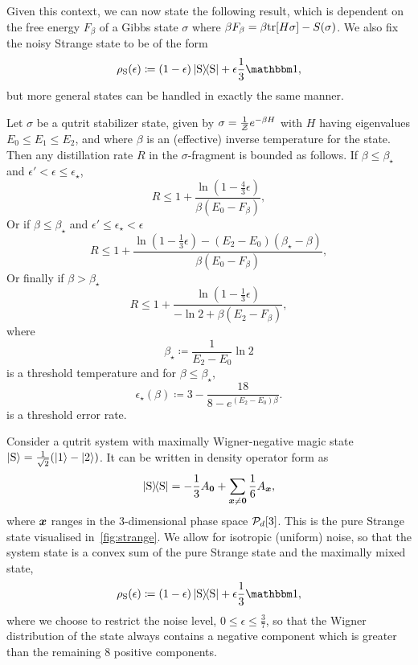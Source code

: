 \documentclass[pra,
aps,
twocolumn,
superscriptaddress,
groupedaddress,
nofootinbib,
reprint
]{revtex4-1}
\begin{document}
Given this context, we can now state the following result, which is dependent on the free energy $F_\beta$ of a Gibbs state $\sigma$ where $ \beta F_\beta =  \beta\tr[H \sigma] - S(\sigma)$. We also fix the noisy Strange state to be of the form 
\begin{equation}
	\rho_{\rm{S}}(\epsilon) \coloneqq (1-\epsilon)\ketbra{\rm{S}} + \epsilon \frac{1}{3}\id,
\end{equation}
but more general states can be handled in exactly the same manner.
\begin{theorem}Let $\sigma$ be a qutrit stabilizer state, given by $\sigma = \frac{1}{\Z} e^{-\beta H}$ with $H$ having eigenvalues $E_0 \le E_1 \le E_2$, and where $\beta$ is an (effective) inverse temperature for the state. Then any distillation rate $R$ in the $\sigma$-fragment is bounded as follows.
If $\beta \leq \beta_{\star}$ and $\epsilon' < \epsilon  \leq \epsilon_{\star}$,
\begin{equation}
	R \leq 1 + \frac{\ln{\left( 1 - \frac{4}{3}\epsilon \right)}}{\beta (E_0 - F_\beta)},
\end{equation}
Or if $\beta \leq \beta_{\star}$ and $\epsilon' \leq \epsilon_{\star} < \epsilon$
\begin{equation}
	R \le 1 + \frac{\ln{\left(1-\frac{1}{3}\epsilon \right)} - (E_2 - E_0)(\beta_{\star} - \beta)}{\beta (E_0 - F_\beta)},
\end{equation}
Or finally if $\beta > \beta_{\star}$
\begin{equation}
	R \leq  1+ \frac{\ln{\left(1-\frac{1}{3}\epsilon \right)}}{-\ln{2} + \beta (E_2 - F_\beta)},
\end{equation}
where
\begin{equation}
	\beta_\star \coloneqq \frac{1}{E_2 - E_0} \ln{2}
\end{equation}
is a threshold temperature and for $\beta \leq \beta_\star$,
\begin{equation}
	\epsilon_{\star}(\beta) \coloneqq 3 - \dfrac{18}{8-e^{(E_2 - E_0)\beta}}.
\end{equation}
is a threshold error rate.
\end{theorem}

Consider a qutrit system with maximally Wigner-negative magic state $\ket{{\rm{S}}} = \frac{1}{\sqrt{2}}(\ket{1} - \ket{2})$.
It can be written in density operator form as
\begin{align}
	\ketbra{\rm{S}} = -\frac{1}{3} A_{\bmo} + \sum_{\bmx \neq \bmo} \frac{1}{6} A_{\bmx},
\end{align}
where $\bmx$ ranges in the $3$-dimensional phase space $\cal{P}_d[3]$.
This is the pure Strange state visualised in~\cref{fig:strange}.
We allow for isotropic (uniform) noise, so that the system state is a convex sum of the pure Strange state and the maximally mixed state,
\begin{equation}
	\rho_{\rm{S}}(\epsilon) \coloneqq (1-\epsilon)\ketbra{\rm{S}} + \epsilon \frac{1}{3}\id,
\end{equation}
where we choose to restrict the noise level, $0 \leq \epsilon \leq \frac{3}{7}$, so that the Wigner distribution of the state always contains a negative component which is greater than the remaining 8 positive components.
\end{document}
